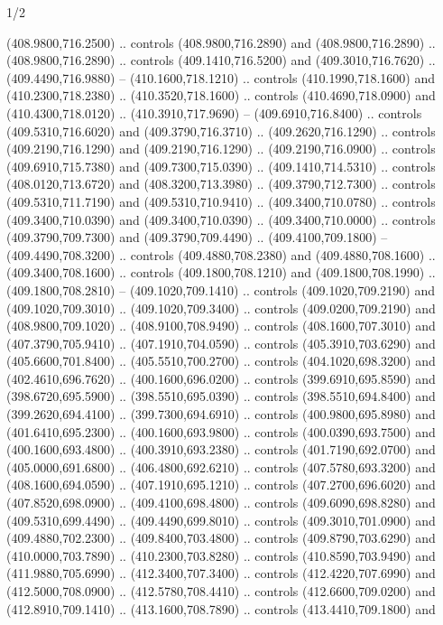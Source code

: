 \begin{flagdescription}{1/2}
\begin{scope}[xshift=0.5\flaglength]
\begin{scope}[scale=0.00745\flagwidth,xshift=-12.1mm,yshift=41.7mm]
\begin{scope}[y=0.80pt, x=0.80pt, yscale=-1, xscale=1, inner sep=0pt, outer sep=0pt]
\begin{scope}[cm={{1.33333,0.0,0.0,-1.33333,(0.0,114.66667)}}]
\begin{scope}[scale=0.100]
  (408.9800,716.2500) .. controls (408.9800,716.2890) and (408.9800,716.2890) ..
  (408.9800,716.2890) .. controls (409.1410,716.5200) and (409.3010,716.7620) ..
  (409.4490,716.9880) -- (410.1600,718.1210) .. controls (410.1990,718.1600) and
  (410.2300,718.2380) .. (410.3520,718.1600) .. controls (410.4690,718.0900) and
  (410.4300,718.0120) .. (410.3910,717.9690) -- (409.6910,716.8400) .. controls
  (409.5310,716.6020) and (409.3790,716.3710) .. (409.2620,716.1290) .. controls
  (409.2190,716.1290) and (409.2190,716.1290) .. (409.2190,716.0900) .. controls
  (409.6910,715.7380) and (409.7300,715.0390) .. (409.1410,714.5310) .. controls
  (408.0120,713.6720) and (408.3200,713.3980) .. (409.3790,712.7300) .. controls
  (409.5310,711.7190) and (409.5310,710.9410) .. (409.3400,710.0780) .. controls
  (409.3400,710.0390) and (409.3400,710.0390) .. (409.3400,710.0000) .. controls
  (409.3790,709.7300) and (409.3790,709.4490) .. (409.4100,709.1800) --
  (409.4490,708.3200) .. controls (409.4880,708.2380) and (409.4880,708.1600) ..
  (409.3400,708.1600) .. controls (409.1800,708.1210) and (409.1800,708.1990) ..
  (409.1800,708.2810) -- (409.1020,709.1410) .. controls (409.1020,709.2190) and
  (409.1020,709.3010) .. (409.1020,709.3400) .. controls (409.0200,709.2190) and
  (408.9800,709.1020) .. (408.9100,708.9490) .. controls (408.1600,707.3010) and
  (407.3790,705.9410) .. (407.1910,704.0590) .. controls (405.3910,703.6290) and
  (405.6600,701.8400) .. (405.5510,700.2700) .. controls (404.1020,698.3200) and
  (402.4610,696.7620) .. (400.1600,696.0200) .. controls (399.6910,695.8590) and
  (398.6720,695.5900) .. (398.5510,695.0390) .. controls (398.5510,694.8400) and
  (399.2620,694.4100) .. (399.7300,694.6910) .. controls (400.9800,695.8980) and
  (401.6410,695.2300) .. (400.1600,693.9800) .. controls (400.0390,693.7500) and
  (400.1600,693.4800) .. (400.3910,693.2380) .. controls (401.7190,692.0700) and
  (405.0000,691.6800) .. (406.4800,692.6210) .. controls (407.5780,693.3200) and
  (408.1600,694.0590) .. (407.1910,695.1210) .. controls (407.2700,696.6020) and
  (407.8520,698.0900) .. (409.4100,698.4800) .. controls (409.6090,698.8280) and
  (409.5310,699.4490) .. (409.4490,699.8010) .. controls (409.3010,701.0900) and
  (409.4880,702.2300) .. (409.8400,703.4800) .. controls (409.8790,703.6290) and
  (410.0000,703.7890) .. (410.2300,703.8280) .. controls (410.8590,703.9490) and
  (411.9880,705.6990) .. (412.3400,707.3400) .. controls (412.4220,707.6990) and
  (412.5000,708.0900) .. (412.5780,708.4410) .. controls (412.6600,709.0200) and
  (412.8910,709.1410) .. (413.1600,708.7890) .. controls (413.4410,709.1800) and

\end{scope}
\end{scope}
\end{scope}
\end{scope}
\end{scope}
\end{flagdescription}
